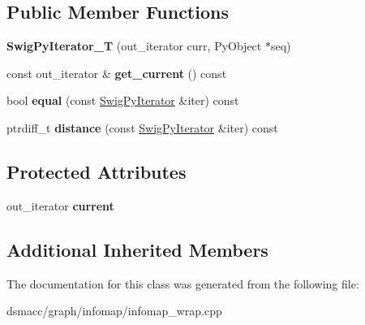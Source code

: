 \subsection*{Public Member Functions}
\begin{DoxyCompactItemize}
\item 
\mbox{\label{classswig_1_1SwigPyIterator__T_aed627e359856103f6e9b2e939fc85d9c}} 
{\bfseries Swig\+Py\+Iterator\+\_\+T} (out\+\_\+iterator curr, Py\+Object $\ast$seq)
\item 
\mbox{\label{classswig_1_1SwigPyIterator__T_a5079275c680963f14ba496ebd4f07c7b}} 
const out\+\_\+iterator \& {\bfseries get\+\_\+current} () const
\item 
\mbox{\label{classswig_1_1SwigPyIterator__T_a14f2ba114f370932df0bf1ab06d0a5e2}} 
bool {\bfseries equal} (const \mbox{\hyperlink{structswig_1_1SwigPyIterator}{Swig\+Py\+Iterator}} \&iter) const
\item 
\mbox{\label{classswig_1_1SwigPyIterator__T_ab98b853b7da59239d8b260be34dbda26}} 
ptrdiff\+\_\+t {\bfseries distance} (const \mbox{\hyperlink{structswig_1_1SwigPyIterator}{Swig\+Py\+Iterator}} \&iter) const
\end{DoxyCompactItemize}
\subsection*{Protected Attributes}
\begin{DoxyCompactItemize}
\item 
\mbox{\label{classswig_1_1SwigPyIterator__T_a7b69908f19b9150a4d2b357567f8bd82}} 
out\+\_\+iterator {\bfseries current}
\end{DoxyCompactItemize}
\subsection*{Additional Inherited Members}


The documentation for this class was generated from the following file\+:\begin{DoxyCompactItemize}
\item 
dsmacc/graph/infomap/infomap\+\_\+wrap.\+cpp\end{DoxyCompactItemize}
